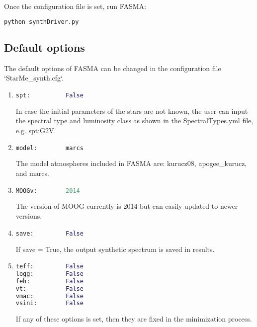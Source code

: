 \documentclass[a4paper,10pt]{article}
\begin{document}
Once the configuration file is set, run FASMA:
\begin{lstlisting}[language=Python]
python synthDriver.py
\end{lstlisting}


\subsection{Default options}

The default options of FASMA can be changed in the configuration file `StarMe\_synth.cfg`.
\begin{enumerate}
 \item
\begin{lstlisting}[language=Python]
spt:          False

\end{lstlisting}
In case the initial parameters of the stars are not known, the user can input the spectral type and luminosity class as shown in the SpectralTypes.yml file, e.g. spt:G2V.

\item
\begin{lstlisting}[language=Python]
model:        marcs
\end{lstlisting}
The model atmospheres included in FASMA are: kurucz08, apogee\_kurucz, and marcs.

\item
\begin{lstlisting}[language=Python]
MOOGv:        2014
\end{lstlisting}
The version of MOOG currently is 2014 but can easily updated to newer versions.

\item
\begin{lstlisting}[language=Python]
save:         False
\end{lstlisting}
If save = True, the output synthetic spectrum is saved in results.

\item
\begin{lstlisting}[language=Python]
teff:         False
logg:         False
feh:          False
vt:           False
vmac:         False
vsini:        False
\end{lstlisting}
If any of these options is set, then they are fixed in the minimization process.


\end{enumerate}
\end{document}
